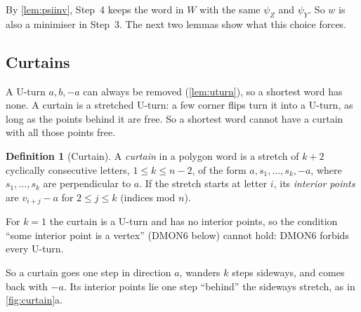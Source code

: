 \documentclass[11pt]{article}
\theoremstyle{plain}
\theoremstyle{definition}
\newtheorem{definition}[theorem]{Definition}
\theoremstyle{remark}
\newcommand{\dmon}[1]{\textup{DMON#1}}
\newcommand{\psiZ}{\psi_Z}
\newcommand{\psiY}{\psi_Y}
\begin{document}
By \cref{lem:psiinv}, Step~4 keeps the word in $W$ with the same $\psiZ$ and $\psiY$. So $w$ is also a
minimiser in Step~3. The next two lemmas show what this choice forces.

\subsection{Curtains}

A U-turn $a,b,-a$ can always be removed (\cref{lem:uturn}), so a shortest word has none. A curtain is a
stretched U-turn: a few corner flips turn it into a U-turn, as long as the points behind it are free.
So a shortest word cannot have a curtain with all those points free.

\begin{definition}[Curtain]
A \emph{curtain} in a polygon word is a stretch of $k+2$ cyclically consecutive letters, $1\le k\le
n-2$, of the form $a,s_1,\dots,s_k,-a$, where $s_1,\dots,s_k$ are perpendicular to $a$. If the stretch
starts at letter $i$, its \emph{interior points} are $v_{i+j}-a$ for $2\le j\le k$ (indices mod $n$).
\end{definition}
For $k=1$ the curtain is a U-turn and has no interior points, so the condition ``some interior point is
a vertex'' (\dmon6 below) cannot hold: \dmon6 forbids every U-turn.

So a curtain goes one step in direction $a$, wanders $k$ steps sideways, and comes back with $-a$. Its
interior points lie one step ``behind'' the sideways stretch, as in \cref{fig:curtain}a.
\end{document}
